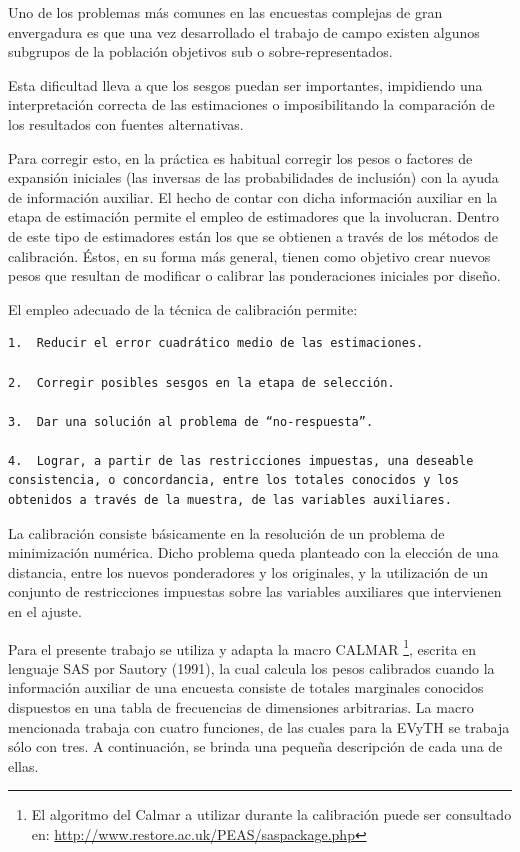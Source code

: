 \documentclass[
  openany]{book}
\begin{document}
Uno de los problemas más comunes en las encuestas complejas de gran envergadura es que una vez desarrollado el trabajo de campo existen algunos subgrupos de la población objetivos sub o sobre-representados.

Esta dificultad lleva a que los sesgos puedan ser importantes, impidiendo una interpretación correcta de las estimaciones o imposibilitando la comparación de los resultados con fuentes alternativas.

Para corregir esto, en la práctica es habitual corregir los pesos o factores de expansión iniciales (las inversas de las probabilidades de inclusión) con la ayuda de información auxiliar. El hecho de contar con dicha información auxiliar en la etapa de estimación permite el empleo de estimadores que la involucran. Dentro de este tipo de estimadores están los que se obtienen a través de los métodos de calibración. Éstos, en su forma más general, tienen como objetivo crear nuevos pesos que resultan de modificar o calibrar las ponderaciones iniciales por diseño.

El empleo adecuado de la técnica de calibración permite:

\begin{verbatim}
1.  Reducir el error cuadrático medio de las estimaciones.

2.  Corregir posibles sesgos en la etapa de selección.

3.  Dar una solución al problema de “no-respuesta”.

4.  Lograr, a partir de las restricciones impuestas, una deseable consistencia, o concordancia, entre los totales conocidos y los obtenidos a través de la muestra, de las variables auxiliares.
\end{verbatim}

La calibración consiste básicamente en la resolución de un problema de minimización numérica. Dicho problema queda planteado con la elección de una distancia, entre los nuevos ponderadores y los originales, y la utilización de un conjunto de restricciones impuestas sobre las variables auxiliares que intervienen en el ajuste.

Para el presente trabajo se utiliza y adapta la macro CALMAR \footnote{El algoritmo del Calmar a utilizar durante la calibración puede ser consultado en: \url{http://www.restore.ac.uk/PEAS/saspackage.php}}, escrita en lenguaje SAS por Sautory (1991), la cual calcula los pesos calibrados cuando la información auxiliar de una encuesta consiste de totales marginales conocidos dispuestos en una tabla de frecuencias de dimensiones arbitrarias. La macro mencionada trabaja con cuatro funciones, de las cuales para la EVyTH se trabaja sólo con tres. A continuación, se brinda una pequeña descripción de cada una de ellas.
\end{document}
